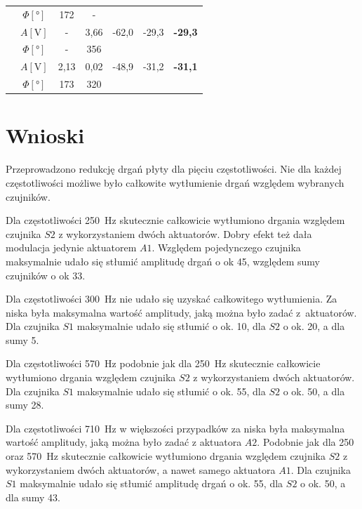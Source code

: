 \documentclass[polish,a4paper,11pt]{mwart}
\let\Oldsection\section
\renewcommand{\section}{\FloatBarrier\Oldsection}
\begin{document}
\begin{table}[!tbh]
\begin{tabular}{|c|c|c|c|c|c|c|}
				       &$\Phi [\si{\degree}]$ & 172 & - & \multicolumn{3}{c}{}\\\cline{2-7}
				       &   $A [\si{\V}]$ & - & 3,66 & -62,0 & -29,3 & \textbf{-29,3} \\\cline{2-7}
				       &$\Phi [\si{\degree}]$ & - & 356 & \multicolumn{3}{c}{}\\\cline{2-7}
				       &   $A [\si{\V}]$ & 2,13 & 0,02 & -48,9 & -31,2 & \textbf{-31,1} \\\cline{2-7}
				       &$\Phi [\si{\degree}]$ & 173 & 320 & \multicolumn{3}{c}{}\\\cline{1-4}
  \end{tabular}
\end{table}

\section{Wnioski}

Przeprowadzono redukcję drgań płyty dla pięciu częstotliwości. Nie dla każdej
częstotliwości możliwe było całkowite wytłumienie drgań względem wybranych
czujników. 

Dla częstotliwości \SI{250}{\hertz} skutecznie całkowicie wytłumiono drgania
względem czujnika $S2$ z wykorzystaniem dwóch aktuatorów. Dobry efekt też dała
modulacja jedynie aktuatorem $A1$. Względem pojedynczego czujnika
maksymalnie udało się stłumić amplitudę drgań o ok \SI{45}{\decibelV}, względem
sumy czujników o ok \SI{33}{\decibelV}.

Dla częstotliwości \SI{300}{\hertz} nie udało się uzyskać całkowitego
wytłumienia. Za niska była maksymalna wartość amplitudy, jaką można było zadać
z~aktuatorów.  Dla czujnika $S1$ maksymalnie udało się stłumić o ok.
\SI{10}{\decibelV}, dla $S2$ o ok. \SI{20}{\decibelV}, a dla sumy
\SI{5}{\decibelV}.

Dla częstotliwości \SI{570}{\hertz} podobnie jak dla \SI{250}{\hertz}
skutecznie całkowicie wytłumiono drgania względem czujnika $S2$ z wykorzystaniem
dwóch aktuatorów. Dla czujnika $S1$ maksymalnie udało się stłumić o ok.
\SI{55}{\decibelV}, dla $S2$ o ok. \SI{50}{\decibelV}, a dla sumy
\SI{28}{\decibelV}.

Dla częstotliwości \SI{710}{\hertz} w większości przypadków za niska była
maksymalna wartość amplitudy, jaką można było zadać z aktuatora $A2$.
Podobnie jak dla 250 oraz \SI{570}{\hertz} skutecznie całkowicie wytłumiono
drgania względem czujnika $S2$ z wykorzystaniem dwóch aktuatorów, a nawet samego
aktuatora $A1$. Dla czujnika $S1$ maksymalnie udało się stłumić
amplitudę drgań o ok. \SI{55}{\decibelV}, dla $S2$ o ok.
\SI{50}{\decibelV}, a dla sumy \SI{43}{\decibelV}.
\end{document}
